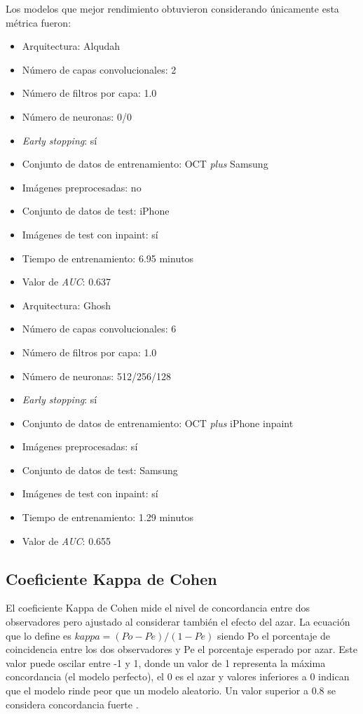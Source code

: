 Los modelos que mejor rendimiento obtuvieron considerando únicamente esta métrica fueron:

\begin{itemize}
    \item Arquitectura: Alqudah
    \item Número de capas convolucionales: 2
    \item Número de filtros por capa: 1.0
    \item Número de neuronas: 0/0
    \item \textit{Early stopping}: sí
    \item Conjunto de datos de entrenamiento: OCT \textit{plus} Samsung
    \item Imágenes preprocesadas: no
    \item Conjunto de datos de test: iPhone
    \item Imágenes de test con inpaint: sí
    \item Tiempo de entrenamiento: 6.95 minutos
    \item Valor de \textit{AUC}: 0.637
\end{itemize}

\begin{itemize}
    \item Arquitectura: Ghosh
    \item Número de capas convolucionales: 6
    \item Número de filtros por capa: 1.0
    \item Número de neuronas: 512/256/128
    \item \textit{Early stopping}: sí
    \item Conjunto de datos de entrenamiento: OCT \textit{plus} iPhone inpaint
    \item Imágenes preprocesadas: sí
    \item Conjunto de datos de test: Samsung
    \item Imágenes de test con inpaint: sí
    \item Tiempo de entrenamiento: 1.29 minutos
    \item Valor de \textit{AUC}: 0.655
\end{itemize}

\subsection{Coeficiente Kappa de Cohen}

El coeficiente Kappa de Cohen mide el nivel de concordancia entre dos observadores pero ajustado al considerar también el efecto del azar. La ecuación que lo define es $kappa = (Po - Pe) / (1 - Pe)$ siendo Po el porcentaje de coincidencia entre los dos observadores y Pe el porcentaje esperado por azar. Este valor puede oscilar entre -1 y 1, donde un valor de 1 representa la máxima concordancia (el modelo perfecto), el 0 es el azar y valores inferiores a 0 indican que el modelo rinde peor que un modelo aleatorio. Un valor superior a 0.8 se considera concordancia fuerte \cite{sklearn:kappa}.

